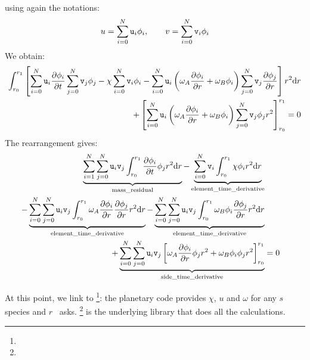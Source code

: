 using again the notations:
\begin{equation}
u = \sum_{i=0}^{N} \mathtt{u}_i \phi_i, \qquad v = \sum_{i=0}^{N} \mathtt{v}_i \phi_i
\end{equation}
We obtain:
\begin{equation}
\begin{split}
 \int_{r_0}^{r_1}\left[
                  \sum_{i=0}^{N}\mathtt{u}_i\frac{\partial\phi_i}{\partial t} \sum_{j=0}^{N}\mathtt{v}_j \phi_j
                 - \chi \sum_{i=0}^{N}\mathtt{v}_i\phi_i 
                 - \sum_{i=0}^{N}\mathtt{u}_i\left(\omega_A\frac{\partial\phi_i}{\partial r} + \omega_B \phi_i\right)
                     \sum_{j=0}^{N}\mathtt{v}_j\frac{\partial\phi_j}{\partial r}\right]r^2\mathrm{d} r \\
 + \left[\sum_{i=0}^{N}\mathtt{u}_i\left(\omega_A\frac{\partial\phi_i}{\partial r} + \omega_B\phi_i \right)\sum_{j=0}^{N}\mathtt{v}_j\phi_j r^2\right]_{r_0}^{r_1} = 0
\end{split}
\end{equation}
The rearrangement gives:
\begin{equation}
\begin{split}
  \underbrace{\sum_{i=1}^{N}\sum_{j=0}^{N}\mathtt{u}_i\mathtt{v}_j\int_{r_0}^{r_1}\frac{\partial\phi_i}{\partial t}\phi_jr^2\mathrm{d} r}_\text{mass\_residual}
- \underbrace{\sum_{i=0}^{N}\mathtt{v}_i\int_{r_0}^{r_1}\chi\phi_i r^2\mathrm{d} r}_\text{element\_time\_derivative} \\
- \underbrace{\sum_{i=0}^{N}\sum_{j=0}^{N}\mathtt{u}_i\mathtt{v}_j\int_{r_0}^{r_1}\omega_A\frac{\partial\phi_i}{\partial r}\frac{\partial\phi_j}{\partial r}r^2\mathrm{d} r}_\text{element\_time\_derivative}
- \underbrace{\sum_{i=0}^{N}\sum_{j=0}^{N}\mathtt{u}_i\mathtt{v}_j\int_{r_0}^{r_1}\omega_B\phi_i\frac{\partial\phi_j}{\partial r}r^2\mathrm{d} r}_\text{element\_time\_derivative} \\
+ \underbrace{\sum_{i=0}^{N}\sum_{j=0}^{N}\mathtt{u}_i\mathtt{v}_j\left[\omega_A\frac{\partial\phi_i}{\partial r}\phi_j r^2 + \omega_B\phi_i\phi_jr^2\right]_{r_0}^{r_1}}_\text{side\_time\_derivative}  & = 0
\end{split}
\end{equation}


At this point, we link to \GRINS\footnote{\GitGrins}: the planetary code provides $\chi$, $u$ and
$\omega$ for any $s$ species and $r$ \GRINS\ asks. \LibMesh\footnote{\GitLibmesh} is the underlying library that
does all the calculations.
